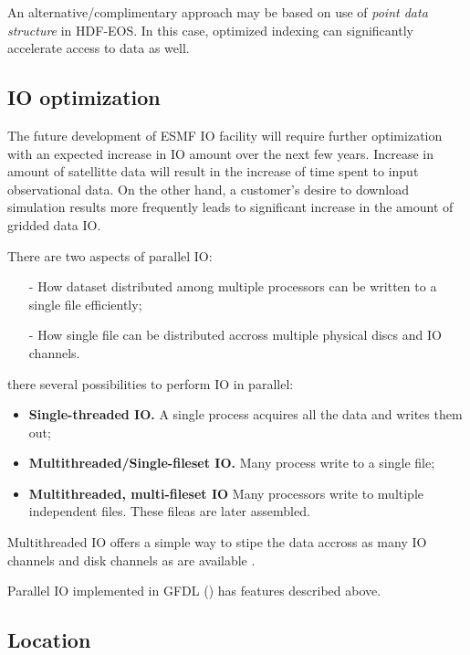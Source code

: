 An alternative/complimentary approach may be based on use of {\em
point data structure} in HDF-EOS. In this case, optimized indexing can
significantly accelerate access to data as well.



\subsection{IO optimization}

The future development of ESMF IO facility will require further
optimization with an expected increase in IO amount over the next few
years. Increase in amount of satellitte data will result in the
increase of time spent to input observational data. On the other hand,
a customer's desire to download simulation results more frequently leads
to significant increase in the amount of gridded data IO.

There are two aspects of  parallel IO:

\begin{itemize}
\item[-] How dataset distributed among multiple processors can be
written to a single file efficiently;

\item[-] How single file can be distributed accross multiple physical
discs and IO channels.
\end{itemize}
 
there several possibilities to perform IO in parallel:
\begin{itemize}
\item {\bf Single-threaded IO.} A single process acquires all the data and
                                writes them out; 
\item {\bf Multithreaded/Single-fileset IO.} Many process write to a
single file;

\item {\bf Multithreaded, multi-fileset IO} Many processors write to
multiple independent files. These fileas are later assembled. 
\end{itemize}

Multithreaded IO offers a simple way to stipe the data accross as many
IO channels and disk channels as are available \cite{
Balaji_Parallel_IO_1999, Balaji_Parallel_IO_2000}.

Parallel IO implemented in GFDL (\cite{mpp_io}) has features described
above.

\subsection{Location}

